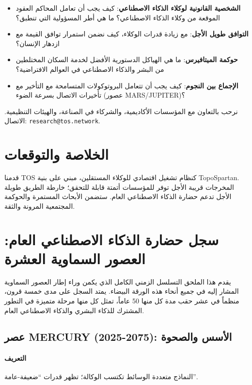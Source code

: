\documentclass[11pt]{article}
\begin{document}
\begin{itemize}[noitemsep]
  \item \textbf{الشخصية القانونية لوكلاء الذكاء الاصطناعي}: كيف يجب أن تعامل المحاكم العقود الموقعة من وكلاء الذكاء الاصطناعي؟ ما هي أطر المسؤولية التي تنطبق؟
  \item \textbf{التوافق طويل الأجل}: مع زيادة قدرات الوكلاء، كيف نضمن استمرار توافق القيمة مع ازدهار الإنسان؟
  \item \textbf{حوكمة الميتافيرس}: ما هي الهياكل الدستورية الأفضل لخدمة السكان المختلطين من البشر والذكاء الاصطناعي في العوالم الافتراضية؟
  \item \textbf{الإجماع بين النجوم}: كيف يجب أن تتعامل البروتوكولات المتسامحة مع التأخير مع تأخيرات الاتصال بسرعة الضوء (عصور MARS/JUPITER)؟
\end{itemize}

نرحب بالتعاون مع المؤسسات الأكاديمية، والشركاء في الصناعة، والهيئات التنظيمية. الاتصال: \texttt{research@tos.network}.

\section{الخلاصة والتوقعات}
قدمنا TOS كنظام تشغيل اقتصادي للوكلاء المستقلين، مبني على بنية TopoSpartan. المخرجات قريبة الأجل توفر للمؤسسات أتمتة قابلة للتحقق؛ خارطة الطريق طويلة الأجل تدعم حضارة الذكاء الاصطناعي العام. ستضمن الأبحاث المستمرة والحوكمة المجتمعية المرونة والثقة.

\appendix
\newpage

\section{سجل حضارة الذكاء الاصطناعي العام: العصور السماوية العشرة}
\label{appendix:chronicle}

يقدم هذا الملحق التسلسل الزمني الكامل الذي يكمن وراء إطار العصور السماوية المشار إليه في جميع أنحاء هذه الورقة البيضاء. يمتد السجل على مدى خمسة قرون، منظماً في عشر حقب مدة كل منها 50 عاماً، تمثل كل منها مرحلة متميزة في التطور المشترك للذكاء البشري والذكاء الاصطناعي العام.

\subsection{عصر MERCURY (2025-2075): الأسس والصحوة}
\paragraph{التعريف} النماذج متعددة الوسائط تكتسب الوكالة؛ تظهر قدرات ``ضعيفة-عامة''.
\end{document}
